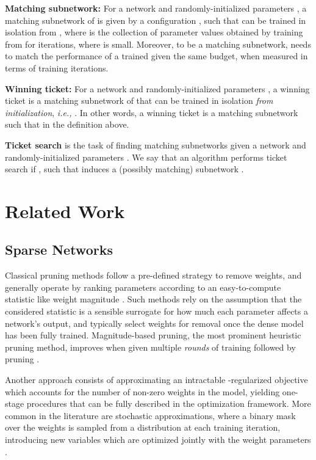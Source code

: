 \documentclass{article}
\newcommand{\citep}[1]{\cite{#1}}
\newcommand{\citet}[1]{\cite{#1}}
\newcommand{\ie}{\textit{i.e.,} }
\begin{document}
\textbf{Matching subnetwork:} For a network  and randomly-initialized parameters , a matching subnetwork  of  is given by a configuration , such that  can be trained in isolation from , where  is the collection of parameter values obtained by training  from  for  iterations, where  is small. Moreover, to be a matching subnetwork,  needs to match the performance of a trained  given the same budget, when measured in terms of training iterations.

\textbf{Winning ticket:} For a network  and randomly-initialized parameters , a winning ticket is a matching subnetwork  of  that can be trained in isolation \textit{from initialization}, \ie . In other words, a winning ticket is a matching subnetwork such that  in the definition above.

\textbf{Ticket search} is the task of finding matching subnetworks given a network  and randomly-initialized parameters . We say that an algorithm  performs ticket search if , such that  induces a (possibly matching) subnetwork .
 \section{Related Work}
\subsection{Sparse Networks}
Classical pruning methods \citep{braindamage} follow a pre-defined strategy to remove weights, and generally operate by ranking parameters according to an easy-to-compute statistic like weight magnitude \citet{magnitudepruning}. Such methods rely on the assumption that the considered statistic is a sensible surrogate for how much each parameter affects a network's output, and typically select weights for removal once the dense model has been fully trained. Magnitude-based pruning, the most prominent heuristic pruning method, improves when given multiple \textit{rounds} of training followed by pruning \cite{magnitudepruning,stateofsparsity}.

Another approach consists of approximating an intractable -regularized objective which accounts for the number of non-zero weights in the model, yielding one-stage procedures that can be fully described in the optimization framework. More common in the literature are stochastic approximations, where a binary mask  over the weights is sampled from a distribution  at each training iteration, introducing new variables  which are optimized jointly with the weight parameters \cite{l0bernoulli, sparsityl0}.
\end{document}
